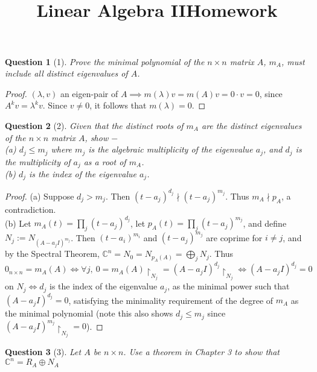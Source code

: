 \documentclass[11pt]{article}
\title{\vspace{-50pt}
\Huge \name
\\\vspace{20pt}
\huge Linear Algebra II\hfill Homework \hw}
\author{}
\date{}
\theoremstyle{quest}
\newtheorem*{question}{Question}
\begin{document}
\maketitle

\begin{question}[1]
Prove the minimal polynomial of the $n \times n$ matrix $A$, $m_A$, must include all distinct eigenvalues of $A$.
\end{question}
\begin{proof}
$(\lambda, v)$ an eigen-pair of $A \implies m(\lambda)v = m(A)v = 0 \cdot v = 0$, since $A^k v = \lambda^k v$. Since $v \ne 0$, it follows that $m(\lambda) = 0$.
\end{proof}
\begin{question}[2]
Given that the distinct roots of $m_A$ are the distinct eigenvalues of the $n \times n$ matrix $A$, show $-$
\\(a) $d_j \le m_j$ where $m_j$ is the algebraic multiplicity of the eigenvalue $a_j$, and $d_j$ is the multiplicity of $a_j$ as a root of  $m_A$.
\\(b) $d_j$ is the index of the eigenvalue $a_j$.
\end{question}
\begin{proof}
(a) Suppose $d_j > m_j$. Then $(t - a_j)^{d_j} \nmid (t - a_j)^{m_j}$. Thus $m_A \nmid p_A$, a contradiction.
\\(b) Let $m_A(t) = \prod_j(t-a_j)^{d_j}$,  let $p_A(t) = \prod_j(t-a_j)^{m_j}$,  and define $N_j := N_{(A-a_jI)^{m_j}}$. Then $(t-a_i)^{m_i}$ and $(t-a_j)^{m_j}$ are coprime for $i \ne j$, and by the Spectral Theorem, $\mathbb{C}^n = N_0 = N_{p_A(A)} = \bigoplus_j N_j$. Thus $0_{n \times n} = m_A(A) \iff \forall j, \ 0 = m_A(A) \restriction_{N_j} = (A - a_jI)^{d_j} \restriction_{N_j} \iff (A - a_jI)^{d_j} = 0$ on $N_j \iff d_j$ is the index of the eigenvalue $a_j$, as the minimal power such that $(A - a_jI)^{d_j} = 0$, satisfying the minimality requirement of the degree of $m_A$ as the minimal polynomial (note this also shows $d_j \le m_j$ since $(A - a_jI)^{m_j}\restriction_{N_j} = 0$).
\end{proof}
\begin{question}[3]
Let $A$ be $n \times n$. Use a theorem in Chapter 3 to show that $\mathbb{C}^n = R_A \oplus N_A$
\end{question}
\end{document}
